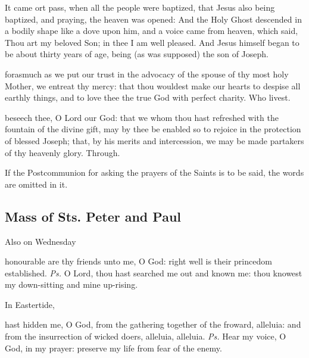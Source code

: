 It came ort pass, when all the people were baptized, that Jesus also being baptized, and praying, the heaven was opened:  And the Holy Ghost descended in a bodily shape like a dove upon him, and a voice came from heaven, which said, Thou art my beloved Son; in thee I am well pleased. And Jesus himself began to be about thirty years of age, being (as was supposed) the son of Joseph.


\secret
{} forasmuch as we put our trust in the advocacy of the spouse of thy most holy Mother, we entreat thy mercy: that thou wouldest make our hearts to despise all earthly things, and to love thee the true God with perfect charity. Who livest.


\postcommunion
{} beseech thee, O Lord our God: that we whom thou hast refreshed with the fountain of the divine gift, may by thee be enabled so to rejoice in the protection of blessed Joseph; that, by his merits and intercession, we may be made partakers of thy heavenly glory. Through.

\begin{rubric}
If the Postcommunion for asking the prayers of the Saints is to be said, the words  are omitted in it.
\end{rubric}


\subsection{Mass of Sts. Peter and Paul}
\begin{inhead}
	Also on Wednesday
\end{inhead}

\introit
{} honourable are thy friends unto me, O God: right well is their princedom established. \textit{Ps.} O Lord, thou hast searched me out and known me: thou knowest my down-sitting and mine up-rising.

\begin{rubric}
	In Eastertide,
\end{rubric}
 hast hidden me, O God, from the gathering together of the froward, alleluia: and from the insurrection of wicked doers, alleluia, alleluia. \textit{Ps.} Hear my voice, O God, in my prayer: preserve my life from fear of the enemy.

